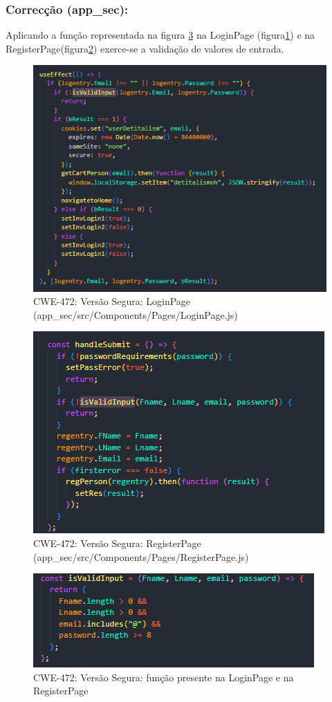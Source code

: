 \subsubsection{Correcção (app\_sec):}
Aplicando a função representada na figura \ref{fig:cwe472-safe-functionvalidinput} na LoginPage (figura\ref{fig:cwe472-safe-loginpage}) e na RegisterPage(figura\ref{fig:cwe472-safe-registerpage}) exerce-se a validação de valores de entrada.
\begin{figure}[H]
  \centering
  \includegraphics[width=0.8\linewidth]{images/CWE472-safe-LoginPage.png}
  \caption{CWE-472: Versão Segura: LoginPage (app\_sec/src/Components/Pages/LoginPage.js)}
  \label{fig:cwe472-safe-loginpage}
\end{figure}
\begin{figure}[H]
  \centering
  \includegraphics[width=0.8\linewidth]{images/CWE472-safe-RegisterPage.png}
  \caption{CWE-472: Versão Segura: RegisterPage (app\_sec/src/Components/Pages/RegisterPage.js)}
  \label{fig:cwe472-safe-registerpage}
\end{figure}
\begin{figure}[H]
  \centering
  \includegraphics[width=0.8\linewidth]{images/CWE472-safe-functionValidInput.png}
  \caption{CWE-472: Versão Segura: função presente na LoginPage e na RegisterPage}
  \label{fig:cwe472-safe-functionvalidinput}
\end{figure}
%
%

